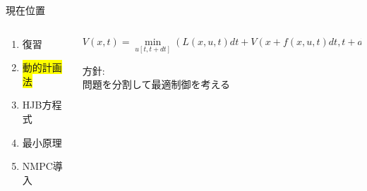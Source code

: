 \documentclass[twocolumn, dvipdfmx,12pt]{beamer}
\begin{document}
    \begin{frame}{現在位置}
        \footnotesize
        \begin{columns}
            \begin{column}{.35\textwidth}
                \begin{enumerate}
                    \item 復習
                    \item \colorbox{yellow}{動的計画法}
                    \item HJB方程式
                    \item 最小原理
                    \item NMPC導入
                \end{enumerate}
            \end{column}
    
            \begin{column}{.7\textwidth}
                \fontsize{7.5pt}{3.5pt}\selectfont
                \begin{screen}
                    \begin{equation*}
                        V(x, t) = \min_{u[t, t+dt]} \left( L(x, u, t) dt + V \left( x + f(x, u, t) dt, t + dt \right) \right)
                    \end{equation*}
                \end{screen}
                \footnotesize
                方針:\\
                \qquad 問題を分割して最適制御を考える \\

            \end{column}
        \end{columns}
    \end{frame}
\end{document}
